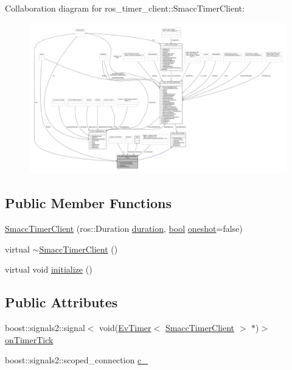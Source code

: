 Collaboration diagram for ros\+\_\+timer\+\_\+client\+:\+:Smacc\+Timer\+Client\+:
\nopagebreak
\begin{figure}[H]
\begin{center}
\leavevmode
\includegraphics[width=350pt]{classros__timer__client_1_1SmaccTimerClient__coll__graph}
\end{center}
\end{figure}
\subsection*{Public Member Functions}
\begin{DoxyCompactItemize}
\item 
\hyperlink{classros__timer__client_1_1SmaccTimerClient_a1cdcbcbf8263680ebc38e475a04c5e4f}{Smacc\+Timer\+Client} (ros\+::\+Duration \hyperlink{classros__timer__client_1_1SmaccTimerClient_afa4e91d5da885c59306d74c7b6e85052}{duration}, \hyperlink{classbool}{bool} \hyperlink{classros__timer__client_1_1SmaccTimerClient_a34bff666381b2a35860a7cf9ab6427e9}{oneshot}=false)
\item 
virtual \hyperlink{classros__timer__client_1_1SmaccTimerClient_a15ee3829b6f6179e91ceb943644a2be6}{$\sim$\+Smacc\+Timer\+Client} ()
\item 
virtual void \hyperlink{classros__timer__client_1_1SmaccTimerClient_a23ca454fd2d9035bb5142c0b9261635a}{initialize} ()
\end{DoxyCompactItemize}
\subsection*{Public Attributes}
\begin{DoxyCompactItemize}
\item 
boost\+::signals2\+::signal$<$ void(\hyperlink{structros__timer__client_1_1EvTimer}{Ev\+Timer}$<$ \hyperlink{classros__timer__client_1_1SmaccTimerClient}{Smacc\+Timer\+Client} $>$ $\ast$)$>$ \hyperlink{classros__timer__client_1_1SmaccTimerClient_aa9219b9e3278fcbd3f8fbe82bfc7a33f}{on\+Timer\+Tick}
\item 
boost\+::signals2\+::scoped\+\_\+connection \hyperlink{classros__timer__client_1_1SmaccTimerClient_a71473af935673138cb1f93a16c8fe37f}{c\+\_\+}
\end{DoxyCompactItemize}
